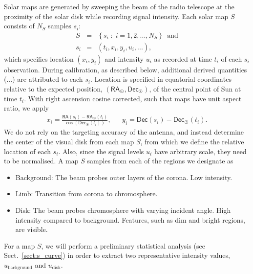 \documentclass{aa}
\newcommand{\eqnl}[2]{\begin{eqnarray}\label{#1}#2\end{eqnarray}}
\newcommand{\s}[2]{{#1}_{\mathrm{#2}}}
\newcommand{\RA}{{\mathsf{RA}}}
\newcommand{\Dec}{{\mathsf{Dec}}}
\begin{document}
  Solar maps are generated by sweeping the beam of the radio telescope at the proximity of the solar disk while recording signal intensity.
  Each solar map $S$ consists of $N_S$ samples $s_i$:
  \eqnl{radio_sample}{
    S &=& \left\{ s_i \;:\; i = 1, 2, ..., N_S \right\}\,\text{ and}\nonumber\\
    s_i &=& \left( t_i, x_i, y_i, u_i, ... \right),
  }
which specifies location $(x_i,y_i)$ and intensity $u_i$ as recorded at time
$t_i$ of each $s_i$ observation.
During calibration, as described below, additional derived quantities ($...$)
are attributed to each $s_i$.
Location is specified in equatorial coordinates relative to the expected
position, $(\RA_{\astrosun}, \Dec_{\astrosun})$, of the central point of Sun
at time $t_i$.
With right ascension cosine corrected, such that maps have unit aspect ratio, we apply 
\eqnl{relative_radec}{
  x_i = \frac{\RA(s_i)
      - \RA_{\astrosun}(t_i)}{\cos \left( \Dec_{\astrosun}(t_i) \right)}, &&
  y_i = \Dec(s_i) - \Dec_{\astrosun}(t_i)\text{.}
  }
  We do not rely on the targeting accuracy of the antenna, and instead
  determine the center of the visual disk from each map $S$, from which we
  define the relative location of each $s_i$.
  Also, since the signal levels $u_i$ have arbitrary scale, 
  they need to be normalised.
  A map $S$ samples from each of the regions we designate as
  \begin{itemize}
  \item Background: The beam probes outer layers of the corona. Low intensity.
  \item Limb: Transition from corona to chromosphere.
  \item Disk: The beam probes chromosphere with varying incident angle. High intensity compared to background. Features, such as dim and bright regions, are visible.
  \end{itemize}

  For a map $S$, we will perform a preliminary statistical analysis (see Sect.~\ref{sect:s_curve}) in order to extract 
  two representative intensity values, $\s{u}{background}$ and $\s{u}{disk}$.
\end{document}
